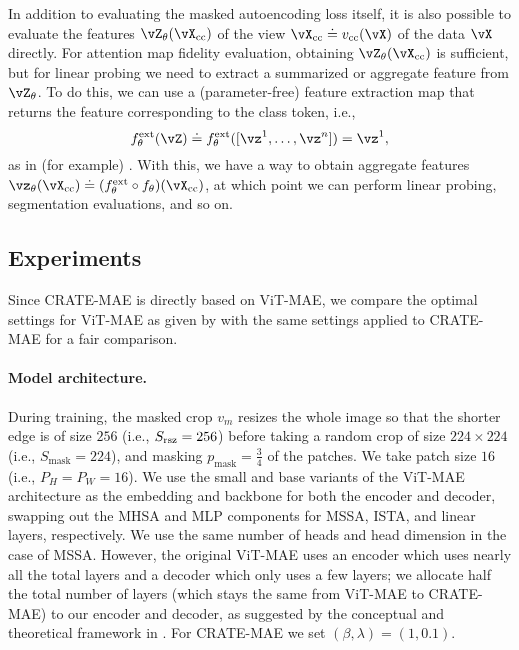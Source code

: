\documentclass[../../book-main.tex]{subfiles}
\begin{document}
In addition to evaluating the masked autoencoding loss itself, it is also possible to evaluate the features \(\vZ_{\theta}(\vX_{\cc})\) of the view \(\vX_{\cc} \doteq v_{\cc}(\vX)\) of the data \(\vX\) directly. For attention map fidelity evaluation, obtaining \(\vZ_{\theta}(\vX_{\cc})\) is sufficient, but for linear probing we need to extract a summarized or aggregate feature from \(\vZ_{\theta}\). To do this, we can use a (parameter-free) feature extraction map that returns the feature corresponding to the class token, i.e.,
\begin{equation}
    f_{\theta}^{\ext}(\vZ) \doteq f_{\theta}^{\ext}([\vz^{1}, \dots, \vz^{n}]) = \vz^{1},
\end{equation}
as in (for example) . With this, we have a way to obtain aggregate features \(\vz_{\theta}(\vX_{\cc}) \doteq (f_{\theta}^{\ext} \circ f_{\theta})(\vX_{\cc})\), at which point we can perform linear probing, segmentation evaluations, and so on.

\subsection{Experiments}\label{sub:image_completion_experiments}

Since CRATE-MAE is directly based on ViT-MAE, we compare the optimal settings for ViT-MAE as given by \citep{he2022masked} with the same settings applied to CRATE-MAE for a fair comparison.

\paragraph{Model architecture.} During training, the masked crop \(v_{m}\) resizes the whole image so that the shorter edge is of size \(256\) (i.e., \(S_{\mathrm{rsz}} = 256\)) before taking a random crop of size \(224 \times 224\) (i.e., \(S_{\mathrm{mask}} = 224\)), and masking \(p_{\mathrm{mask}} = \frac{3}{4}\) of the patches. We take patch size \(16\) (i.e., \(P_{H} = P_{W} = 16\)). We use the small and base variants of the ViT-MAE architecture as the embedding and backbone for both the encoder and decoder, swapping out the MHSA and MLP components for MSSA, ISTA, and linear layers, respectively. We use the same number of heads and head dimension in the case of MSSA. However, the original ViT-MAE uses an encoder which uses nearly all the total layers and a decoder which only uses a few layers; we allocate half the total number of layers (which stays the same from ViT-MAE to CRATE-MAE) to our encoder and decoder, as suggested by the conceptual and theoretical framework in . For CRATE-MAE we set \((\beta, \lambda) = (1, 0.1)\).
\end{document}
